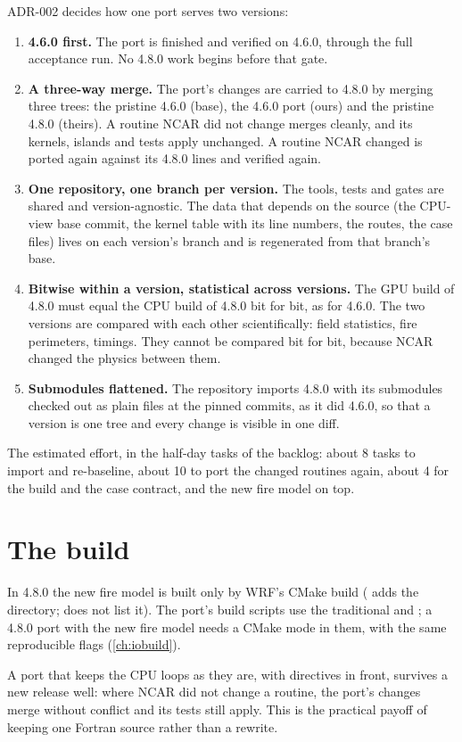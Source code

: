 ADR-002 decides how one port serves two versions:
\begin{enumerate}
  \item \textbf{4.6.0 first.} The port is finished and verified on 4.6.0, through the full acceptance run. No 4.8.0 work
    begins before that gate.
  \item \textbf{A three-way merge.} The port's changes are carried to 4.8.0 by merging three trees: the pristine
    4.6.0 (base), the 4.6.0 port (ours) and the pristine 4.8.0 (theirs). A routine NCAR did not change merges cleanly,
    and its kernels, islands and tests apply unchanged. A routine NCAR changed is ported again against its 4.8.0 lines
    and verified again.
  \item \textbf{One repository, one branch per version.} The tools, tests and gates are shared and version-agnostic.
    The data that depends on the source (the CPU-view base commit, the kernel table with its line numbers, the routes,
    the case files) lives on each version's branch and is regenerated from that branch's base.
  \item \textbf{Bitwise within a version, statistical across versions.} The GPU build of 4.8.0 must equal the CPU build
    of 4.8.0 bit for bit, as for 4.6.0. The two versions are compared with each other scientifically: field
    statistics, fire perimeters, timings. They cannot be compared bit for bit, because NCAR changed the physics
    between them.
  \item \textbf{Submodules flattened.} The repository imports 4.8.0 with its submodules checked out as plain files at
    the pinned commits, as it did 4.6.0, so that a version is one tree and every change is visible in one diff.
\end{enumerate}

The estimated effort, in the half-day tasks of the backlog: about 8 tasks to import and re-baseline, about 10 to port
the changed routines again, about 4 for the build and the case contract, and the new fire model on top.

\section{The build}

In 4.8.0 the new fire model is built only by WRF's CMake build ( adds the
 directory;  does not list it). The port's build scripts use the traditional
 and ; a 4.8.0 port with the new fire model needs a CMake mode in them, with the same
reproducible flags (\cref{ch:iobuild}).

\begin{keypoint}
A port that keeps the CPU loops as they are, with directives in front, survives a new release well: where NCAR did
not change a routine, the port's changes merge without conflict and its tests still apply. This is the practical
payoff of keeping one Fortran source rather than a rewrite.
\end{keypoint}
